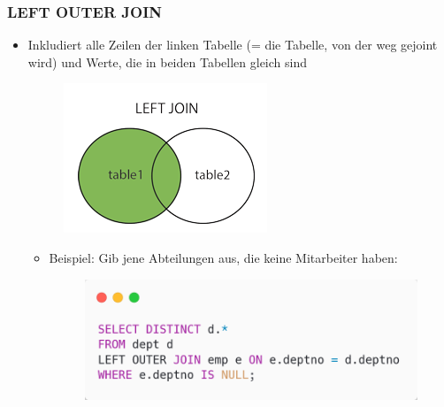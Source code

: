 \subsubsection{LEFT OUTER JOIN}
\begin{itemize}
    \item Inkludiert alle Zeilen der linken Tabelle (= die Tabelle, von der weg gejoint wird) und Werte, die in beiden Tabellen gleich sind
    \begin{figure}[H]
        \centering
        \includegraphics{res/themekorb_2/joins_left_outer_join.png} 
    \end{figure}
    \begin{itemize}
        \item Beispiel: Gib jene Abteilungen aus, die keine Mitarbeiter haben:
        \begin{figure}[H]
            \centering 
            \includegraphics[scale=.45]{res/themekorb_2/joins_left_outer_join_example.png}
        \end{figure}
    \end{itemize}
\end{itemize}

